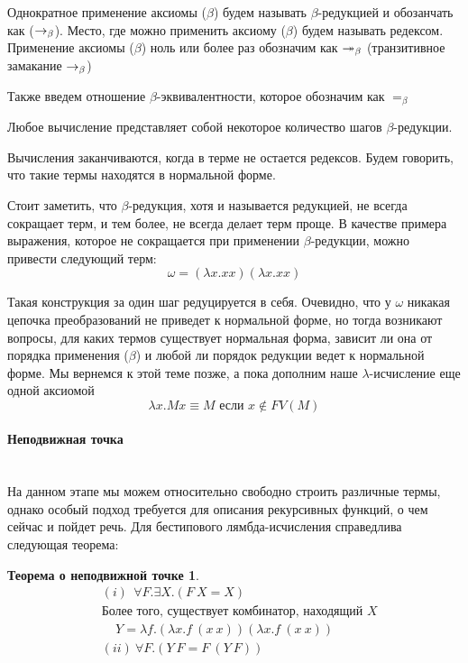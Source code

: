 \documentclass[lambda.tex]{subfiles}
\begin{document}
Однократное применение аксиомы ($\beta$) будем называть $\beta$-редукцией и обозанчать как ($\rightarrow_\beta$). Место, где можно применить аксиому ($\beta$) будем называть редексом. 
Применение аксиомы ($\beta$) ноль или более раз обозначим как $\twoheadrightarrow_\beta$ (транзитивное замакание $\rightarrow_\beta$)

Также введем отношение $\beta$-эквивалентности, которое обозначим как $=_\beta$

Любое вычисление представляет собой некоторое количество шагов $\beta$-редукции.

Вычисления заканчиваются, когда в терме не остается редексов. Будем говорить, что такие термы находятся в нормальной форме.

Стоит заметить, что $\beta$-редукция, хотя и называется редукцией, не всегда сокращает терм, и тем более, не всегда делает терм проще. В качестве примера выражения, которое не сокращается при применении $\beta$-редукции, можно привести следующий терм:
\begin{equation*}
	\omega = (\lambda x.xx)(\lambda x.xx)
\end{equation*}

Такая конструкция за один шаг редуцируется в себя. Очевидно, что у $\omega$ никакая цепочка преобразований не приведет к нормальной форме, но тогда возникают вопросы, для каких термов существует нормальная форма, зависит ли она от порядка применения ($\beta$) и любой ли порядок редукции ведет к нормальной форме. Мы вернемся к этой теме позже, а пока дополним наше $\lambda$-исчисление еще одной аксиомой
\begin{equation*}
	\lambda x.Mx \equiv M \text{ если }x \not\in FV(M) \tag{$\eta$}
\end{equation*}

\newpage
\paragraph{Неподвижная точка} %
\label{par:fix point}~\\

На данном этапе мы можем относительно свободно строить различные термы, однако особый подход требуется для описания рекурсивных функций, о чем сейчас и пойдет речь. Для бестипового лямбда-исчисления справедлива следующая теорема:
\newtheorem*{fixpoint}{Теорема о неподвижной точке}
\begin{fixpoint}
\begin{align*}
	&(i)\ \ \forall F. \exists X. (F\ X = X) \\
	&\text{Более того, существует комбинатор, находящий $X$}\\
	&\ \ \ \ \ Y = \lambda f.(\lambda x.f\ (x\ x)) (\lambda x.f\ (x\ x))\\
	&(ii)\ \forall F.(Y\ F=F\ (Y\ F))
\end{align*}
\end{fixpoint}
\end{document}
